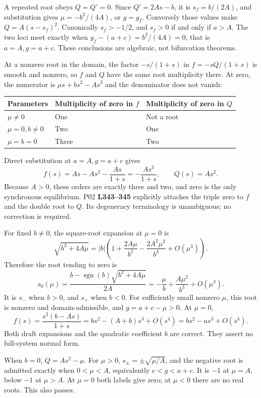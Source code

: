 \documentclass[11pt]{article}
\newcommand{\lin}[1]{\textbf{L#1}}
\begin{document}
A repeated root obeys \(Q=Q'=0\). Since \(Q'=2As-b\), it is
\(s_f=b/(2A)\), and substitution gives \(\mu=-b^2/(4A)\), or
\(g=g_f\). Conversely those values make \(Q=A(s-s_f)^2\).
Canonically \(s_f>-1/2\), and \(s_f>0\) if and only if \(a>A\).
The two loci meet exactly when
\(g_f-(a+c)=b^2/(4A)=0\), that is \(a=A,g=a+c\).
These conclusions are algebraic, not bifurcation theorems.

At a nonzero root in the domain, the factor \(-s/(1+s)\) in
\(f=-sQ/(1+s)\) is smooth and nonzero, so \(f\) and \(Q\)
have the same root multiplicity there.
At zero, the numerator is \(\mu s+bs^2-As^3\) and the denominator
does not vanish:
\begin{center}
\begin{tabular}{@{}lll@{}}
\toprule
Parameters & Multiplicity of zero in \(f\)& Multiplicity of zero in \(Q\)\\
\midrule
\(\mu\ne0\)& One & Not a root\\
\(\mu=0,b\ne0\)& Two & One\\
\(\mu=b=0\)& Three & Two\\
\bottomrule
\end{tabular}
\end{center}
Direct substitution at \(a=A,g=a+c\) gives
\[
f(s)=As-As^2-\frac{As}{1+s}=-\frac{As^3}{1+s},
\qquad Q(s)=As^2.
\]
Because \(A>0\), these orders are exactly three and two, and zero
is the only synchronous equilibrium.
P02 \lin{343--345} explicitly attaches the triple zero to \(f\)
and the double root to \(Q\). Its degeneracy terminology is
unambiguous; no correction is required.

For fixed \(b\ne0\), the square-root expansion at \(\mu=0\) is
\[
\sqrt{b^2+4A\mu}
=|b|\left(1+\frac{2A\mu}{b^2}
-\frac{2A^2\mu^2}{b^4}+O(\mu^3)\right).
\]
Therefore the root tending to zero is
\[
s_0(\mu)=\frac{b-\operatorname{sgn}(b)\sqrt{b^2+4A\mu}}{2A}
=-\frac{\mu}{b}+\frac{A\mu^2}{b^3}+O(\mu^3).
\]
It is \(s_-\) when \(b>0\), and \(s_+\) when \(b<0\).
For sufficiently small nonzero \(\mu\), this root is nonzero and
domain-admissible, and \(g=a+c-\mu>0\). At \(\mu=0\),
\[
f(s)=\frac{s^2(b-As)}{1+s}
=bs^2-(A+b)s^3+O(s^4)=bs^2-as^3+O(s^4).
\]
Both draft expansions and the quadratic coefficient \(b\) are correct.
They assert no full-system normal form.

When \(b=0\), \(Q=As^2-\mu\). For \(\mu>0\),
\(s_\pm=\pm\sqrt{\mu/A}\), and the negative root is admitted exactly
when \(0<\mu<A\), equivalently \(c<g<a+c\). It is \(-1\) at
\(\mu=A\), below \(-1\) at \(\mu>A\). At \(\mu=0\) both labels
give zero; at \(\mu<0\) there are no real roots. This also passes.
\end{document}
